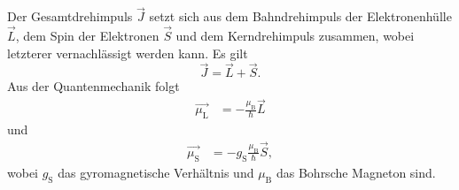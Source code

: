 Der Gesamtdrehimpuls $\vec{J}$ setzt sich aus dem Bahndrehimpuls der Elektronenhülle $\vec{L}$, dem Spin der Elektronen $\vec{S}$ und dem Kerndrehimpuls zusammen, wobei letzterer vernachlässigt
werden kann. Es gilt
\begin{equation*}
\vec{J} = \vec{L} + \vec{S}.
\end{equation*}
Aus der Quantenmechanik folgt
\begin{align*}
\vec{\mu_\text{L}} &= -\frac{\mu_\text{B}}{\hbar}\vec{L} 
\end{align*}
und
\begin{align*}
\vec{\mu_\text{S}} &= -g_\text{S}\frac{\mu_\text{B}}{\hbar}\vec{S},
\end{align*}
wobei $g_\text{S}$ das gyromagnetische Verhältnis und $\mu_\text{B}$ das Bohrsche Magneton sind.

